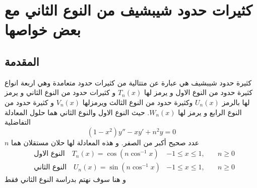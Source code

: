 \chapter{كثيرات حدود شيبشيف من النوع الثاني مع بعض خواصها}
\section{المقدمة}
كثيرة حدود شيبشيف هي عبارة عن متتالية من كثيرات حدود متعامدة وهي اربعة انواع كثيرة حدود من النوع الاول و يرمز لها $T_n(x)$ و كثيرات حدود من النوع الثاني و يرمز لها بالرمز $U_n(x)$ وكثيرة حدود من النوع الثالث  ويرمزلها $V_n(x)$ و كثيرة حدود من النوع الرابع و يرمز لها $W_n(x)$. حيث النوع الاول والنوع الثاني هما حلول المعادلة التفاضلية
\begin{equation}
	(1-x^2)y'' - xy' + n^2 y = 0
\end{equation}
$n$ عدد صحيح أكبر من الصفر. و هذه المعادلة لها حلان مستقلان هما
\begin{align}
	&\text{النوع الاول}\quad T_n(x) = \cos (n \cos^{-1} x) & -1\leq x \leq 1, &\quad n\geq 0 \\
	&\text{النوع الثاني} \quad U_n(x) = \sin (n \cos^{-1} x) & -1\leq x \leq 1, &\quad n\geq 0 
\end{align}
و هنا سوف نهتم بدراسة النوع الثاني فقط

